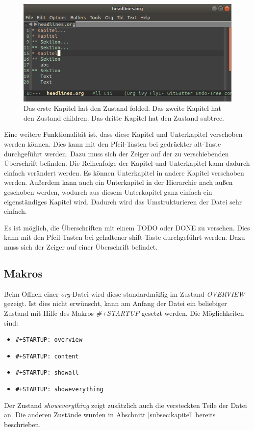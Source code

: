 \begin{figure}[h]
  \centering
  \includegraphics[width=.95\textwidth]{./images/KonfigurationUndPakete/headlines.png}
  \caption{\label{fig:headlines} Das erste Kapitel hat den Zustand
    {\glqq}folded{\grqq}. Das zweite Kapitel hat den Zustand
    {\glqq}children{\grqq}. Das dritte Kapitel hat den Zustand
    {\glqq}subtree{\grqq}.}
\end{figure}

Eine weitere Funktionalität ist, dass diese Kapitel und Unterkapitel
verschoben werden können. Dies kann mit den Pfeil-Tasten bei
gedrückter alt-Taste durchgeführt werden. Dazu muss sich der Zeiger
auf der zu verschiebenden Überschrift befinden. Die Reihenfolge der
Kapitel und Unterkapitel kann dadurch einfach verändert werden. Es
können Unterkapitel in andere Kapitel verschoben werden. Außerdem kann
auch ein Unterkapitel in der Hierarchie nach {\glqq}außen{\grqq}
geschoben werden, wodurch aus diesem Unterkapitel ganz einfach ein
eigenständiges Kapitel wird. Dadurch wird das Umstrukturieren der
Datei sehr einfach.

Es ist möglich, die Überschriften mit einem {\glqq}TODO{\grqq} oder
{\glqq}DONE{\grqq} zu versehen. Dies kann mit den Pfeil-Tasten bei
gehaltener shift-Taste durchgeführt werden. Dazu muss sich der Zeiger
auf einer Überschrift befindet.\\

\subsection{Makros}
\label{subsec:makro}
Beim Öffnen einer \textit{org}-Datei wird diese standardmäßig im
Zustand \textit{OVERVIEW} gezeigt. Ist dies nicht erwünscht, kann am
Anfang der Datei ein beliebiger Zustand mit Hilfe des Makros
\textit{\#+STARTUP} gesetzt werden. Die Möglichkeiten sind:
\begin{itemize}
\item \texttt{\#+STARTUP: overview}
\item \texttt{\#+STARTUP: content}
\item \texttt{\#+STARTUP: showall}
\item \texttt{\#+STARTUP: showeverything}
\end{itemize}
Der Zustand \textit{showeverything} zeigt zusätzlich auch die
versteckten Teile der Datei an. Die anderen Zustände wurden in
Abschnitt \ref{subsec:kapitel} bereits beschrieben.

